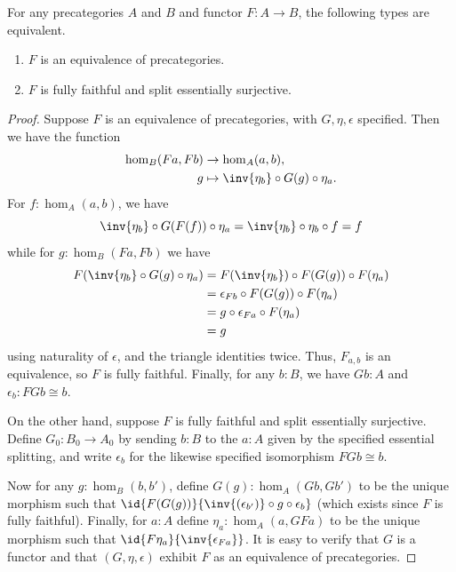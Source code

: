 \begin{lem}\label{ct:ffeso}
  For any precategories $A$ and $B$ and functor $F:A\to B$, the following types are equivalent.
  \begin{enumerate}
  \item $F$ is an equivalence of precategories.\label{item:ct:ffeso1}
  \item $F$ is fully faithful and split essentially surjective.\label{item:ct:ffeso2}
  \end{enumerate}
\end{lem}
\begin{proof}
  Suppose $F$ is an equivalence of precategories, with $G,\eta,\epsilon$ specified.
  Then we have the function
  \begin{align*}
      \hom_B(Fa,Fb) &\to \hom_A(a,b),\\
      g &\mapsto \inv{\eta_b}\circ G(g)\circ \eta_a.
  \end{align*}
  For $f:\hom_A(a,b)$, we have
  \[ \inv{\eta_{b}}\circ G(F(f))\circ \eta_{a}  =
  \inv{\eta_{b}} \circ \eta_{b} \circ f=
  f
  \]
  while for $g:\hom_B(Fa,Fb)$ we have
  \begin{align*}
    F(\inv{\eta_b} \circ G(g)\circ\eta_a)
    &= F(\inv{\eta_b})\circ F(G(g))\circ F(\eta_a)\\
    &= \epsilon_{Fb}\circ F(G(g))\circ F(\eta_a)\\
    &= g\circ\epsilon_{Fa}\circ F(\eta_a)\\
    &= g
  \end{align*}
  using naturality of $\epsilon$, and the triangle identities twice.
  Thus, $F_{a,b}$ is an equivalence, so $F$ is fully faithful.
  Finally, for any $b:B$, we have $Gb:A$ and $\epsilon_b:FGb\cong b$.

  On the other hand, suppose $F$ is fully faithful and split essentially surjective.
  Define $G_0:B_0\to A_0$ by sending $b:B$ to the $a:A$ given by the specified essential splitting, and write $\epsilon_b$ for the likewise specified isomorphism $FGb\cong b$.

  Now for any $g:\hom_B(b,b')$, define $G(g):\hom_A(Gb,Gb')$ to be the unique morphism such that $\id{F(G(g))}{\inv{(\epsilon_{b'})}\circ g \circ \epsilon_b }$ (which exists since $F$ is fully faithful).
  Finally, for $a:A$ define $\eta_a:\hom_A(a,GFa)$ to be the unique morphism such that $\id{F\eta_a}{\inv{\epsilon_{Fa}}}$.
  It is easy to verify that $G$ is a functor and that $(G,\eta,\epsilon)$ exhibit $F$ as an equivalence of precategories.


\end{proof}
